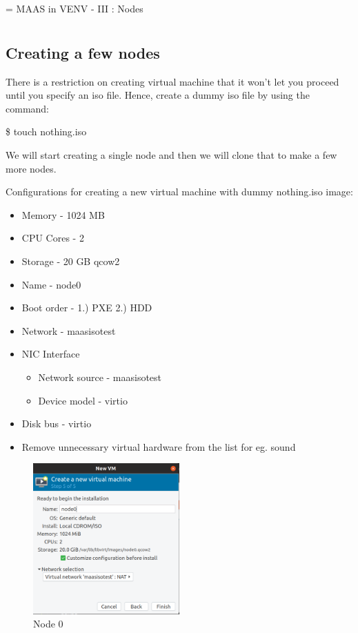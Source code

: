 \chapname = {MAAS in VENV - III : Nodes}

\chapter{\the\chapname}

\section{Creating a few nodes}

There is a restriction on creating virtual machine that it won't let you proceed until you specify an iso file. Hence, create a dummy iso file by using the command: 

\$ touch nothing.iso

We will start creating a single node and then we will clone that to make a few more nodes.

Configurations for creating a new virtual machine with dummy nothing.iso image:

\begin{itemize}
    \setlength\itemsep{0em}
    \item Memory - 1024 MB
    \item CPU Cores - 2
    \item Storage - 20 GB qcow2 
    \item Name - node0
    \item Boot order - 1.) PXE  2.) HDD
    \item Network - maasisotest
    \item NIC Interface 
    \begin{itemize}
        \item Network source - maasisotest
        \item Device model - virtio
    \end{itemize}
    \item Disk bus - virtio
    \item Remove unnecessary virtual hardware from the list for eg. sound
\end{itemize}

\begin{figure}[!ht]
    \centering
    \includegraphics[width=0.5\textwidth]{images/5-1.png}
    \caption{Node 0}
\end{figure}


